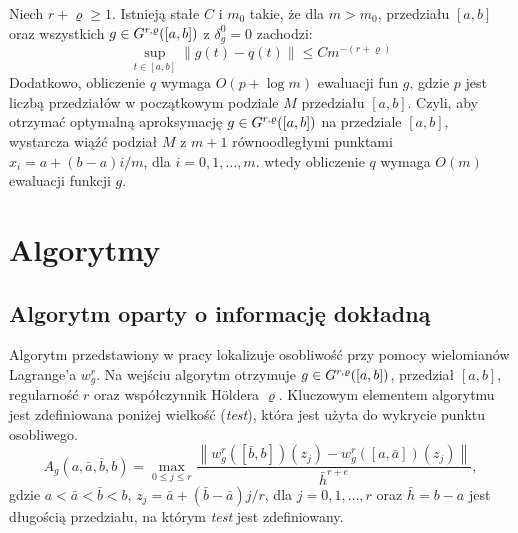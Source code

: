 \documentclass[oik, pdftex, robocza, man]{mgrwms}
\begin{document}
    \begin{thm}
        \label{2014_tw1}
        Niech $r+\varrho \geq 1$. Istnieją stałe $C$ i $m_{0}$ takie, że dla $m>m_{0}$, przedziału $[a,b]$ oraz wszystkich $g \in G^{r,\varrho}([a,b])$ z $\delta_{g}^{0} = 0$ zachodzi:
        \begin{equation*}
            \sup_{t \in [a,b]} \| g(t) - q(t) \| \leq Cm^{-(r+\varrho)}
        \end{equation*}
        Dodatkowo, obliczenie $q$ wymaga $O(p+\log m)$ ewaluacji fun $g$, gdzie $p$ jest liczbą przedziałów w początkowym podziale $M$ przedziału $[a,b]$. Czyli, aby otrzymać optymalną aproksymację $g \in G^{r,\varrho}([a,b])$ na przedziale $[a,b]$, wystarcza wiąźć podział $M$ z $m+1$ równoodległymi punktami $x_{i} = a+(b-a)i/m$, dla $i=0,1,\dots,m$. wtedy obliczenie $q$ wymaga $O(m)$ ewaluacji funkcji $g$.
    \end{thm}

\mgrclosechapter


\chapter{Algorytmy}

\section{Algorytm oparty o informację dokładną}

    Algorytm przedstawiony w pracy \cite{CoDF} lokalizuje osobliwość przy pomocy wielomianów Lagrange'a $w_{g}^{r}$. Na wejściu algorytm otrzymuje $g \in G^{r,\varrho}([a,b])$, przedział $[a,b]$, regularność $r$ oraz współczynnik Höldera $\varrho$. Kluczowym elementem algorytmu jest zdefiniowana poniżej wielkość (\textit{test}), która jest użyta do wykrycie punktu osobliwego.
    \begin{equation}
        \label{eqn:test}
        A_{g}(a, \bar{a}, \bar{b}, b)=\max _{0 \leq j \leq r} \frac{\left\|w_{g}^{r}([\bar{b}, b])\left(z_{j}\right)-w_{g}^{r}([a, \bar{a}])\left(z_{j}\right)\right\|}{\bar{h}^{r+e}},
    \end{equation}
    gdzie $a<\bar{a}<\bar{b}<b$, $z_{j} = \bar{a} + (\bar{b} - \bar{a})j/r$, dla $j=0,1,\dots,r$ oraz $\bar{h} = b - a$ jest długością przedziału, na którym \textit{test} jest zdefiniowany.
\end{document}
